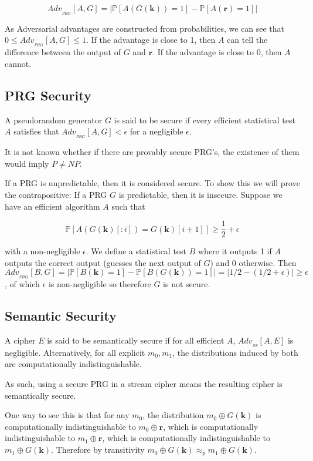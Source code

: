 \documentclass{article}
\begin{document}
\begin{multicols}{2}
$$
Adv_{_{PRG}}[A, G] = | \mathbb{P}[A(G(\mathbf{k})) = 1] - \mathbb{P}[A(\mathbf{r}) = 1] |
$$

As Adversarial advantages are constructed from probabilities, we can see that $0 \leq Adv_{_{PRG}}[A, G] \leq 1$. If the advantage is close to 1, then $A$ can tell the difference between the output of $G$ and $\mathbf{r}$. If the advantage is close to 0, then $A$ cannot. 

\subsection {PRG Security}

A pseudorandom generator $G$ is said to be secure if every efficient statistical test $A$ satisfies that $Adv_{_{PRG}}[A, G] < \epsilon$ for a negligible $\epsilon$.

It is not known whether if there are provably secure PRG's, the existence of them would imply $P \neq NP$.

If a PRG is unpredictable, then it is considered secure. To show this we will prove the contrapositive: If a PRG $G$ is predictable, then it is insecure. Suppose we have an efficient algorithm $A$ such that 

$$
\mathbb{P}[A(G(\mathbf{k})[:i]) = G(\mathbf{k})[i+1]] \geq \frac{1}{2} + \epsilon
$$

with a non-negligible $\epsilon$. We define a statistical test $B$ where it outputs 1 if $A$ outputs the correct output (guesses the next output of $G$) and 0 otherwise. Then $Adv_{_{PRG}}[B,G] = |\mathbb{P}[B(\mathbf{k}) = 1] - \mathbb{P}[B(G(\mathbf{k})) = 1]| = | 1/2 - (1/2 + \epsilon)| \geq \epsilon$, of which $\epsilon$ is non-negligible so therefore $G$ is not secure.

\subsection {Semantic Security}

A cipher $E$ is said to be semantically secure if for all efficient $A$, $Adv_{_{SS}}[A,E]$ is negligible. Alternatively, for all explicit $m_0, m_1$, the distributions induced by both are computationally indistinguishable.

As such, using a secure PRG in a stream cipher means the resulting cipher is semantically secure.

One way to see this is that for any $m_0$, the distribution $m_0 \oplus G(\mathbf{k})$ is computationally indistinguishable to $m_0 \oplus \mathbf{r}$, which is computationally indistinguishable to $m_1 \oplus \mathbf{r}$, which is computationally indistinguishable to $m_1 \oplus G(\mathbf{k})$. Therefore by transitivity $m_0 \oplus G(\mathbf{k}) \approx_p m_1 \oplus G(\mathbf{k})$.


\end{multicols}
\end{document}
